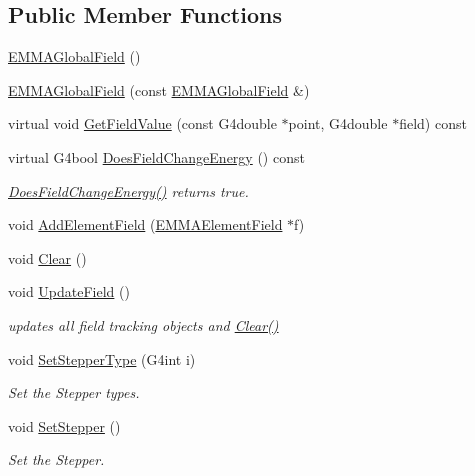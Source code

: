 \subsection*{Public Member Functions}
\begin{DoxyCompactItemize}
\item 
\hyperlink{classEMMAGlobalField_aa7da25d6b1bd0dcb2de9c1abff624d06}{E\+M\+M\+A\+Global\+Field} ()
\item 
\hyperlink{classEMMAGlobalField_aa9210ce2f1f4f7b84c59dacb2ddaa4f4}{E\+M\+M\+A\+Global\+Field} (const \hyperlink{classEMMAGlobalField}{E\+M\+M\+A\+Global\+Field} \&)
\item 
virtual void \hyperlink{classEMMAGlobalField_ac88fc8d757a71e47c720d9954a575d92}{Get\+Field\+Value} (const G4double $\ast$point, G4double $\ast$field) const 
\item 
virtual G4bool \hyperlink{classEMMAGlobalField_a92e2746d98c6504ff36881afd3a96628}{Does\+Field\+Change\+Energy} () const 
\begin{DoxyCompactList}\small\item\em \hyperlink{classEMMAGlobalField_a92e2746d98c6504ff36881afd3a96628}{Does\+Field\+Change\+Energy()} returns true. \end{DoxyCompactList}\item 
void \hyperlink{classEMMAGlobalField_a42a0c7aa1746b0f11c3be62e7c7da49c}{Add\+Element\+Field} (\hyperlink{classEMMAElementField}{E\+M\+M\+A\+Element\+Field} $\ast$f)
\item 
void \hyperlink{classEMMAGlobalField_a82ae7d2395858dbc63145e1f00a73c72}{Clear} ()
\item 
void \hyperlink{classEMMAGlobalField_a89ebf29cff77048404ea6955333d5ae3}{Update\+Field} ()
\begin{DoxyCompactList}\small\item\em updates all field tracking objects and \hyperlink{classEMMAGlobalField_a82ae7d2395858dbc63145e1f00a73c72}{Clear()} \end{DoxyCompactList}\item 
void \hyperlink{classEMMAGlobalField_affba41c140eb80d7815e659e8633da3f}{Set\+Stepper\+Type} (G4int i)
\begin{DoxyCompactList}\small\item\em Set the Stepper types. \end{DoxyCompactList}\item 
void \hyperlink{classEMMAGlobalField_aeeded90085be4bfec4fc248550dc389d}{Set\+Stepper} ()
\begin{DoxyCompactList}\small\item\em Set the Stepper. \end{DoxyCompactList}\item 

\end{DoxyCompactItemize}
